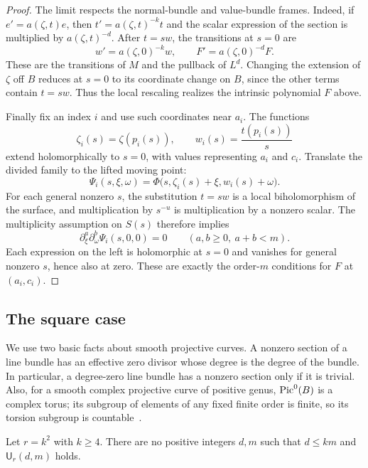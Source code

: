 \begin{proof}
The limit respects the normal-bundle and value-bundle frames.  Indeed,
if $e'=a(\zeta,t)e$, then $t'=a(\zeta,t)^{-k}t$ and the scalar
expression of the section is multiplied by $a(\zeta,t)^{-d}$.
After $t=sw$, the transitions at $s=0$ are
\[
 w'=a(\zeta,0)^{-k}w,
 \qquad
 F'=a(\zeta,0)^{-d}F.
\]
These are the transitions of $M$ and the pullback of $L^d$.
Changing the extension of $\zeta$ off $B$ reduces at $s=0$ to its
coordinate change on $B$, since the other terms contain $t=sw$.
Thus the local rescaling realizes the intrinsic polynomial $F$ above.

Finally fix an index $i$ and use such coordinates near $a_i$.  The
functions
\[
 \zeta_i(s)=\zeta(p_i(s)),
 \qquad
 w_i(s)=\frac{t(p_i(s))}{s}
\]
extend holomorphically to $s=0$, with values representing $a_i$ and
$c_i$.  Translate the divided family to the lifted moving point:
\[
 \Psi_i(s,\xi,\omega)
   =\Phi\bigl(s,\zeta_i(s)+\xi,w_i(s)+\omega\bigr).
\]
For each general nonzero $s$, the substitution $t=sw$ is a local
biholomorphism of the surface, and multiplication by $s^{-u}$ is
multiplication by a nonzero scalar.  The multiplicity assumption on
$S(s)$ therefore implies
\[
 \partial_\xi^a\partial_\omega^b
 \Psi_i(s,0,0)=0
 \qquad(a,b\ge0,\ a+b<m).
\]
Each expression on the left is holomorphic at $s=0$ and vanishes
for general nonzero $s$, hence also at zero.  These are exactly the
order-$m$ conditions for $F$ at $(a_i,c_i)$.
\end{proof}

\subsection{The square case}

We use two basic facts about smooth projective curves.  A nonzero
section of a line bundle has an effective zero divisor whose degree
is the degree of the bundle.  In particular, a degree-zero line
bundle has a nonzero section only if it is trivial.  Also, for a
smooth complex projective curve of positive genus, $\operatorname{Pic}^0(B)$ is
a complex torus; its subgroup of elements of any fixed finite order
is finite, so its torsion subgroup is countable~\cite[Tag~0C1Z]{Stacks}.

\begin{proposition}
\label{prop:squares}
Let $r=k^2$ with $k\ge4$.  There are no positive integers $d,m$ such
that $d\le km$ and $\mathsf U_r(d,m)$ holds.
\end{proposition}

